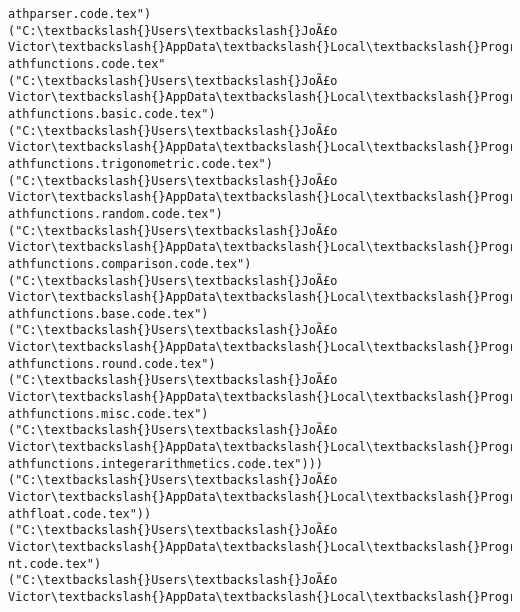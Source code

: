 \documentclass[11pt]{article}
\begin{document}
\begin{Verbatim}[commandchars=\\\{\}]
athparser.code.tex")
("C:\textbackslash{}Users\textbackslash{}JoÃ£o Victor\textbackslash{}AppData\textbackslash{}Local\textbackslash{}Programs\textbackslash{}MiKTeX\textbackslash{}tex/generic/pgf/math\textbackslash{}pgfm
athfunctions.code.tex"
("C:\textbackslash{}Users\textbackslash{}JoÃ£o Victor\textbackslash{}AppData\textbackslash{}Local\textbackslash{}Programs\textbackslash{}MiKTeX\textbackslash{}tex/generic/pgf/math\textbackslash{}pgfm
athfunctions.basic.code.tex")
("C:\textbackslash{}Users\textbackslash{}JoÃ£o Victor\textbackslash{}AppData\textbackslash{}Local\textbackslash{}Programs\textbackslash{}MiKTeX\textbackslash{}tex/generic/pgf/math\textbackslash{}pgfm
athfunctions.trigonometric.code.tex")
("C:\textbackslash{}Users\textbackslash{}JoÃ£o Victor\textbackslash{}AppData\textbackslash{}Local\textbackslash{}Programs\textbackslash{}MiKTeX\textbackslash{}tex/generic/pgf/math\textbackslash{}pgfm
athfunctions.random.code.tex")
("C:\textbackslash{}Users\textbackslash{}JoÃ£o Victor\textbackslash{}AppData\textbackslash{}Local\textbackslash{}Programs\textbackslash{}MiKTeX\textbackslash{}tex/generic/pgf/math\textbackslash{}pgfm
athfunctions.comparison.code.tex")
("C:\textbackslash{}Users\textbackslash{}JoÃ£o Victor\textbackslash{}AppData\textbackslash{}Local\textbackslash{}Programs\textbackslash{}MiKTeX\textbackslash{}tex/generic/pgf/math\textbackslash{}pgfm
athfunctions.base.code.tex")
("C:\textbackslash{}Users\textbackslash{}JoÃ£o Victor\textbackslash{}AppData\textbackslash{}Local\textbackslash{}Programs\textbackslash{}MiKTeX\textbackslash{}tex/generic/pgf/math\textbackslash{}pgfm
athfunctions.round.code.tex")
("C:\textbackslash{}Users\textbackslash{}JoÃ£o Victor\textbackslash{}AppData\textbackslash{}Local\textbackslash{}Programs\textbackslash{}MiKTeX\textbackslash{}tex/generic/pgf/math\textbackslash{}pgfm
athfunctions.misc.code.tex")
("C:\textbackslash{}Users\textbackslash{}JoÃ£o Victor\textbackslash{}AppData\textbackslash{}Local\textbackslash{}Programs\textbackslash{}MiKTeX\textbackslash{}tex/generic/pgf/math\textbackslash{}pgfm
athfunctions.integerarithmetics.code.tex")))
("C:\textbackslash{}Users\textbackslash{}JoÃ£o Victor\textbackslash{}AppData\textbackslash{}Local\textbackslash{}Programs\textbackslash{}MiKTeX\textbackslash{}tex/generic/pgf/math\textbackslash{}pgfm
athfloat.code.tex"))
("C:\textbackslash{}Users\textbackslash{}JoÃ£o Victor\textbackslash{}AppData\textbackslash{}Local\textbackslash{}Programs\textbackslash{}MiKTeX\textbackslash{}tex/generic/pgf/math\textbackslash{}pgfi
nt.code.tex")
("C:\textbackslash{}Users\textbackslash{}JoÃ£o Victor\textbackslash{}AppData\textbackslash{}Local\textbackslash{}Programs\textbackslash{}MiKTeX\textbackslash{}tex/generic/pgf/basiclaye

\end{Verbatim}
\end{document}
